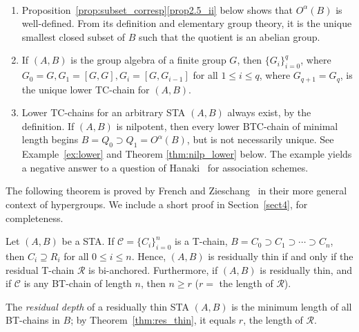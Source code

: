 \begin{rema}\ \relax
\label{rem:not_unique}

\begin{enumerate}[label = (\roman*)] 
\item\label{rema1.13_i} Proposition~\ref{prop:subset_corresp}\ref{prop2.5_ii} below shows that
$O^{\alpha}(B)$ is well-defined. From its definition and elementary
group theory, it is the unique smallest closed subset of
$B$ such that the quotient is an abelian group. 
\item\label{rema1.13_ii} If $(A, B)$ is the group algebra of a finite group $G$, then
$\{G_i\}_{i=0}^q$, where $G_0 = G, G_1 = [G, G], G_i = [G, G_{i-1}]$ for all
$1 \leq i \leq q$, where $G_{q+1} = G_q$, is the unique lower TC-chain
for $(A, B)$.
\item\label{rema1.13_iii} Lower TC-chains for an arbitrary STA $(A, B)$ always exist, by the
definition. 
If $(A, B)$ is nilpotent, then every lower BTC-chain of minimal
length 
begins $B = Q_0 \supset Q_1 = O^{\alpha}(B)$, but is not necessarily
unique. 
See Example~\ref{ex:lower} and Theorem 
\ref{thm:nilp_lower} below. The example yields a negative answer to 
a 
question of Hanaki~\cite [Question~2.11]{H} for association
schemes. 
\end{enumerate}
\end{rema} 

The following theorem is proved by French and Zieschang~\cite [Theorem~6.1]{FZ} in their more
general context of hypergroups. We include a short proof in Section~\ref{sect4},
for completeness. 

\begin{thm}
\label{thm:res_thin}
Let $(A, B)$ be a STA. If $\mathcal{C} = \{C_i\}_{i=0}^n$ is a T-chain,
$B = C_0 \supset C_1 \supset \cdots \supset C_n$, then $C_i \supseteq
R_i$ for all $0 \leq i \leq n$. Hence, $(A, B)$ is residually thin if
and only if the residual T-chain $\mathcal{R}$ is bi-anchored.
Furthermore, if $(A, B)$ is residually thin, and if $\mathcal{C}$ is any
BT-chain of length $n$, then $n \geq r$ \textup{(}$r =$ the length of
$\mathcal{R}$\textup{)}.
\end{thm}

\begin{defi} 
\label{def:depth}
The \emph{residual depth} of a residually thin STA $(A, B)$ is the
minimum length of all BT-chains in $B$; by Theorem~\ref{thm:res_thin},
it equals $r$, the length of $\mathcal{R}$.
\end{defi}

